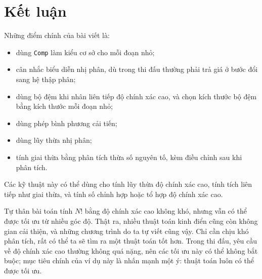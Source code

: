 \documentclass[11pt]{article}
\begin{document}
\section{Kết luận}

Những điểm chính của bài viết là:
\begin{itemize}
  \item dùng \texttt{Comp} làm kiểu cơ sở cho mỗi đoạn nhỏ;
  \item cân nhắc biểu diễn nhị phân, dù trong thi đấu thường phải trả giá ở
  bước đổi sang hệ thập phân;
  \item dùng bộ đệm khi nhân liên tiếp độ chính xác cao, và chọn kích thước
  bộ đệm bằng kích thước mỗi đoạn nhỏ;
  \item dùng phép bình phương cải tiến;
  \item dùng lũy thừa nhị phân;
  \item tính giai thừa bằng phân tích thừa số nguyên tố, kèm điều chỉnh sau
  khi phân tích.
\end{itemize}

Các kỹ thuật này có thể dùng cho tính lũy thừa độ chính xác cao, tính tích
liên tiếp như giai thừa, và tính số chỉnh hợp hoặc tổ hợp độ chính xác cao.

Tự thân bài toán tính \(N!\) bằng độ chính xác cao không khó, nhưng vẫn có
thể được tối ưu từ nhiều góc độ. Thật ra, nhiều thuật toán kinh điển cũng còn
không gian cải thiện, và những chương trình do ta tự viết cũng vậy. Chỉ cần
chịu khó phân tích, rất có thể ta sẽ tìm ra một thuật toán tốt hơn. Trong thi
đấu, yêu cầu về độ chính xác cao thường không quá nặng, nên các tối ưu này có
thể không bắt buộc; mục tiêu chính của ví dụ này là nhấn mạnh một ý: thuật
toán luôn có thể được tối ưu.
\end{document}
